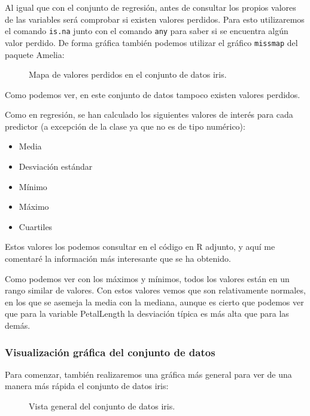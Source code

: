 Al igual que con el conjunto de regresión, antes de consultar los propios valores de las variables será comprobar si existen valores perdidos. Para esto utilizaremos el comando \texttt{is.na} junto con el comando \texttt{any} para saber si se encuentra algún valor perdido. De forma gráfica también podemos utilizar el gráfico \texttt{missmap} del paquete Amelia:


\begin{figure}[H]
	\centering
	
	\caption{Mapa de valores perdidos en el conjunto de datos iris.}
	\label{fig:missmap_iris}
\end{figure}

Como podemos ver, en este conjunto de datos tampoco existen valores perdidos.

Como en regresión, se han calculado los siguientes valores de interés para cada predictor (a excepción de la clase ya que no es de tipo numérico):

\begin{itemize}
	\item Media
	\item Desviación estándar
	\item Mínimo
	\item Máximo
	\item Cuartiles
\end{itemize}


Estos valores los podemos consultar en el código en R adjunto, y aquí me comentaré la información más interesante que se ha obtenido.

Como podemos ver con los máximos y mínimos, todos los valores están en un rango similar de valores. Con estos valores vemos que son relativamente normales, en los que se asemeja la media con la mediana, aunque es cierto que podemos ver que para la variable PetalLength la desviación típica es más alta que para las demás.

\subsubsection{Visualización gráfica del conjunto de datos}

Para comenzar, también realizaremos una gráfica más general para ver de una manera más rápida el conjunto de datos iris:

\begin{figure}[H]
	\centering
	
	\caption{Vista general del conjunto de datos iris.}
	\label{fig:vista_general_iris}
\end{figure}


